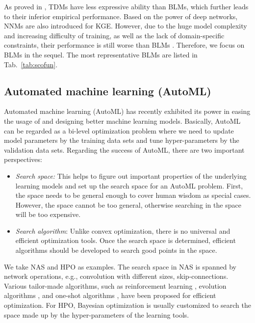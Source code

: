 \documentclass[conference]{IEEEtran}
\begin{document}
{
As proved in \cite{wang2017multi}, 
TDMs have less expressive ability than BLMs,
which further leads to their inferior empirical performance.
Based on the power of deep networks,
NNMs are also introduced for KGE.
However, 
due to the huge model complexity and increasing difficulty of training,
as well as the lack of domain-specific constraints,
their performance is still worse than BLMs
\cite{dettmers2017convolutional,lacroix2018canonical}.
Therefore,
we focus on BLMs in the sequel.
The most representative BLMs are listed in Tab.~\ref{tab:scofun}.}



\subsection{Automated machine learning (AutoML)}
\label{sec:automl}
Automated machine learning (AutoML) \cite{automl_book,quanming2018auto}
has recently exhibited its power
in easing the usage of and designing better machine learning models.
Basically,
AutoML can be regarded as a bi-level optimization problem
where we need to update model parameters by the training data sets
and tune hyper-parameters by the validation data sets.
Regarding the success of AutoML,
there are two important perspectives:
\begin{itemize}[leftmargin=8px]
	\item
	\textit{ Search space:}
	This helps to figure out important properties of the 
	underlying learning models and set up the search space for an AutoML problem.
	First,
	the space needs to be general enough
	to cover human wisdom as special cases.
	However,
	the space cannot be too general,
	otherwise searching in the space will be too expensive.
	\item
	\textit{ Search algorithm}:
	Unlike convex optimization,
	there is no universal and efficient optimization tools.
Once the search space is determined,
	efficient algorithms should be developed to search good points in the space.
\end{itemize}

We take NAS and HPO as examples.
The search space in NAS is spanned by network operations,
e.g., convolution with different sizes, skip-connections.
Various tailor-made algorithms,
such as 
reinforcement learning \cite{zoph2017neural}, 
evolution algorithms \cite{xie2017genetic},
and one-shot algorithms \cite{liu2018darts,yao2019differentiable},
have been proposed for efficient optimization.
For HPO,
Bayesian optimization \cite{feurer2015efficient,falkner2018bohb} is usually customized to search the space
made up by the hyper-parameters of the learning tools.
\end{document}
